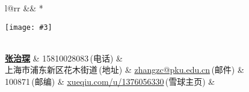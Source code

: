 \newcommand{\paint}[3]{
    \begin{minipage}{#1}
        \texttt{[image: \#3]}
    \end{minipage} 
}
\newcommand{\myheader}{
\begin{tabular*}{\textwidth}{l@{\extracolsep{\fill}}rr}
  && \multirow{4}*{\paint{2.6cm}{3.2cm}{./image.jpg}}\\
  \specialrule{0em}{4pt}{4pt}
  \textbf{\href{http://herechen.github.io}{\LARGE 张治琛}} & 15810028083$\,${\color{labelgrey}(电话)} &\\
  上海市浦东新区花木街道$\,${\color{labelgrey}(地址)} & \href{mailto:zhangzc@pku.edu.cn}{zhangzc@pku.edu.cn}$\,${\color{labelgrey}(邮件)} & \\
  100871$\,${\color{labelgrey}(邮编)} & \href{https://xueqiu.com/u/1376056330}{xueqiu.com/u/1376056330}$\,${\color{labelgrey}(雪球主页)} & \\
  \end{tabular*}\\\vspace{0.1in}
}

\myheader


